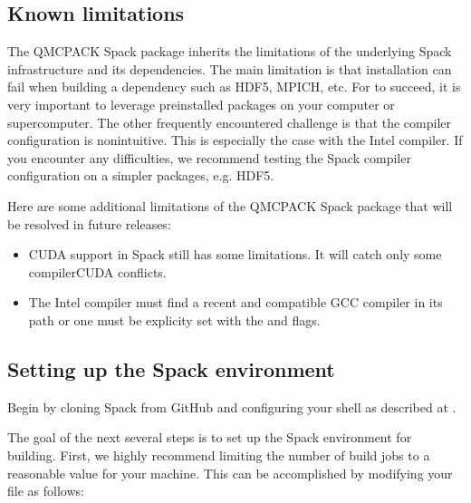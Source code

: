 \documentclass[letterpaper,10pt,english]{sphinxmanual}
\begin{document}
\subsection{Known limitations}
\label{\detokenize{installation:known-limitations}}
The QMCPACK Spack package inherits the limitations of the underlying
Spack infrastructure and its dependencies. The main limitation is that
installation can fail when building a dependency such as HDF5, MPICH,
etc. For  to succeed, it is very
important to leverage preinstalled packages on your computer or
supercomputer. The other frequently encountered challenge is that the
compiler configuration is nonintuitive.  This is especially the case
with the Intel compiler. If you encounter any difficulties, we
recommend testing the Spack compiler configuration on a simpler
packages, e.g. HDF5.

Here are some additional limitations of the QMCPACK Spack package that
will be resolved in future releases:
\begin{itemize}
\item {} 
CUDA support in Spack still has some limitations.  It will
catch only some compiler\sphinxhyphen{}CUDA conflicts.

\item {} 
The Intel compiler must find a recent and compatible GCC
compiler in its path or one must be explicity set with the
 and  flags.

\end{itemize}


\subsection{Setting up the Spack environment}
\label{\detokenize{installation:setting-up-the-spack-environment}}
Begin by cloning Spack from GitHub and configuring your shell as described at
.

The goal of the next several steps is to set up the Spack environment
for building. First, we highly recommend limiting the number of build jobs to
a reasonable value for your machine. This can be
accomplished by modifying your  file as follows:

\begin{sphinxVerbatim}[commandchars=\\\{\}]
   
\end{sphinxVerbatim}
\end{document}
